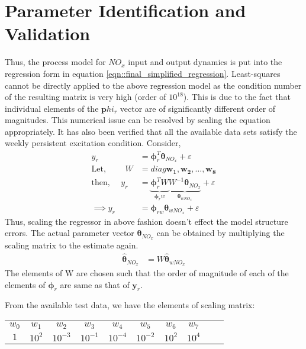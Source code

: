 \newpage
\section{Parameter Identification and Validation}

Thus, the process model for $NO_x$ input and output dynamics is put into the regression form in equation
\ref{eqn::final_simplified_regression}. Least-squares cannot be directly applied to the above regression model as the
condition number of the resulting matrix is very high (order of $10^{18}$). This is due to the fact that individual
elements of the $\pmb phi_r$ vector are of significantly different order of magnitudes. This numerical issue can be
resolved by scaling the equation appropriately. It has also been verified that all the available data sets satisfy the weekly persistent excitation condition. Consider,
\begin{align*}
        y_r &= \pmb \phi_r^T \pmb \theta_{NO_x} + \varepsilon\\
        \text{Let, } \qquad W &= diag \bm{w_1, w_2, \hdots, w_8}\\
        \text{then, } \quad y_r &= \underbrace{\pmb \phi_r^T  W}_{\pmb \phi_rw}
                        \underbrace{ W^{-1} \pmb \theta_{NO_x}}_{\pmb \theta_{wNO_x}} + \varepsilon\\
        \implies y_r &= \pmb \phi_{rw} \pmb \theta_{w NO_x} + \varepsilon
\end{align*}
Thus, scaling the regressor in above fashion doesn't effect the model structure errors. The actual parameter vector $\pmb \theta_{NO_x}$ can be obtained by multiplying the scaling matrix to the estimate again.
\begin{align*}
        \hat{\pmb \theta}_{NO_x} &= W \hat{\pmb \theta}_{wNO_x}
\end{align*}
The elements of W are chosen such that the order of magnitude of each of the elements of $\pmb \phi_r$ are same as that of $\pmb y_r$.

From the available test data, we have the elements of scaling matrix:
\begin{table}[H]
        \centering
        \begin{tabular}{c c c c c c c c c c}
                $w_0$ & $w_1$  & $w_2$     & $w_3$     & $w_4$     & $w_5$     & $w_6$  & $w_7$ \\
                $1$   & $10^2$ & $10^{-3}$ & $10^{-1}$ & $10^{-4}$ & $10^{-2}$ & $10^2$ & $10^{4}$
        \end{tabular}
\end{table}



